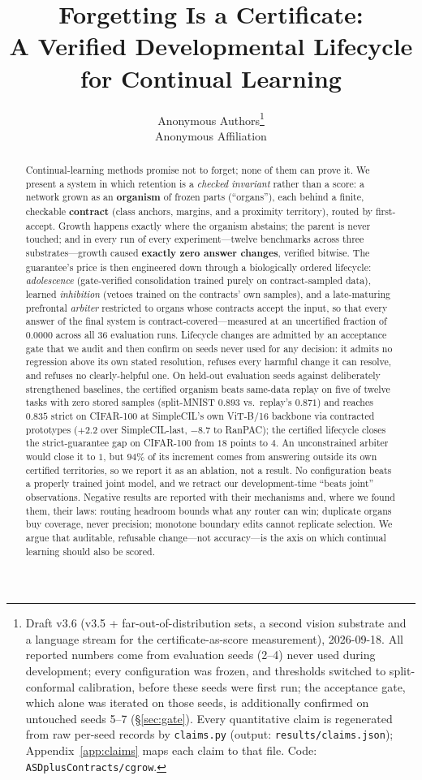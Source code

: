 \documentclass{article}
\title{Forgetting Is a Certificate:\\A Verified Developmental Lifecycle for Continual Learning}
\author{%
  Anonymous Authors\thanks{Draft v3.6 (v3.5 + far-out-of-distribution sets, a second vision substrate and a language stream for the certificate-as-score measurement), 2026-09-18. All reported numbers come from evaluation seeds (2--4) never used during development; every configuration was frozen, and thresholds switched to split-conformal calibration, before these seeds were first run; the acceptance gate, which alone was iterated on those seeds, is additionally confirmed on untouched seeds 5--7 (\S\ref{sec:gate}). Every quantitative claim is
  regenerated from raw per-seed records by \texttt{claims.py}
  (output: \texttt{results/claims.json}); Appendix~\ref{app:claims} maps each
  claim to that file. Code: \texttt{ASDplusContracts/cgrow}.}\\
  Anonymous Affiliation\\
}
\begin{document}
\maketitle

\begin{abstract}
Continual-learning methods promise not to forget; none of them can prove it.
We present a system in which retention is a \emph{checked invariant} rather
than a score: a network grown as an \textbf{organism} of frozen parts
(``organs''), each behind a finite, checkable \textbf{contract} (class anchors,
margins, and a proximity territory), routed by first-accept. Growth happens
exactly where the organism abstains; the parent is never touched; and in every
run of every experiment---twelve benchmarks across three substrates---growth
caused \textbf{exactly zero answer changes}, verified bitwise. The guarantee's
price is then engineered down through a biologically ordered lifecycle:
\emph{adolescence} (gate-verified consolidation trained purely on
contract-sampled data), learned \emph{inhibition} (vetoes trained on the
contracts' own samples), and a late-maturing prefrontal \emph{arbiter}
restricted to organs whose contracts accept the input, so that every answer of
the final system is contract-covered---measured at an uncertified fraction of
$0.0000$ across all $36$ evaluation runs. Lifecycle changes are admitted by an
acceptance gate that we audit and then confirm on seeds never used for any
decision: it admits no regression above its own stated resolution, refuses
every harmful change it can resolve, and refuses no clearly-helpful one. On
held-out evaluation seeds against deliberately strengthened baselines, the
certified organism beats same-data replay on five of twelve tasks with zero
stored samples (split-MNIST $0.893$ vs.\ replay's $0.871$) and reaches $0.835$
strict on CIFAR-100 at SimpleCIL's own ViT-B/16 backbone via contracted
prototypes ($+2.2$ over SimpleCIL-last, $-8.7$ to RanPAC); the certified
lifecycle closes the strict-guarantee gap on CIFAR-100 from $18$ points to
$4$. An unconstrained arbiter would close it to $1$, but $94\%$ of its
increment comes from answering outside its own certified territories, so we
report it as an ablation, not a result. No configuration beats a properly
trained joint model, and we retract our development-time ``beats joint''
observations. Negative results are reported with their mechanisms and, where we
found them, their laws: routing headroom bounds what any router can win;
duplicate organs buy coverage, never precision; monotone boundary edits cannot
replicate selection. We argue that auditable, refusable change---not
accuracy---is the axis on which continual learning should also be scored.
\end{abstract}
\end{document}
